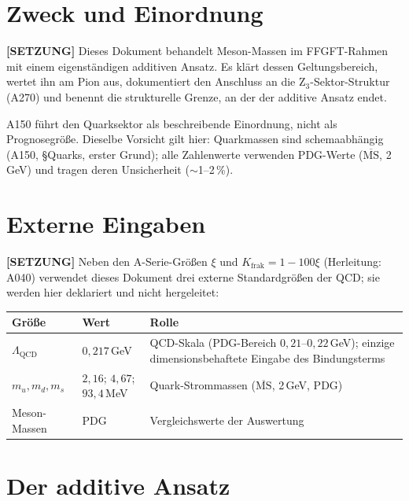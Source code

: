
\section{Zweck und Einordnung}

\textbf{[SETZUNG]} Dieses Dokument behandelt Meson-Massen im
FFGFT-Rahmen mit einem eigenständigen additiven Ansatz. Es klärt dessen
Geltungsbereich, wertet ihn am Pion aus, dokumentiert den Anschluss an
die Z$_3$-Sektor-Struktur (A270) und benennt die strukturelle Grenze,
an der der additive Ansatz endet.

A150 führt den Quarksektor als beschreibende Einordnung, nicht als
Prognosegröße. Dieselbe Vorsicht gilt hier: Quarkmassen sind
schemaabhängig (A150, \S{}Quarks, erster Grund); alle Zahlenwerte
verwenden PDG-Werte ($\overline{\text{MS}}$, 2\,GeV) und tragen deren
Unsicherheit ($\sim$1--2\,\%).

\section{Externe Eingaben}

\textbf{[SETZUNG]} Neben den A-Serie-Größen $\xi$ und
$K_\text{frak} = 1-100\xi$ (Herleitung: A040) verwendet dieses Dokument
drei externe Standardgrößen der QCD; sie werden hier deklariert und
nicht hergeleitet:

\begin{center}
\renewcommand{\arraystretch}{1.3}
{\small\begin{tabular}{llp{6cm}}
\toprule
Größe & Wert & Rolle \\
\midrule
$\Lambda_\text{QCD}$ & $0{,}217$\,GeV & QCD-Skala (PDG-Bereich
$0{,}21$--$0{,}22$\,GeV); einzige dimensionsbehaftete Eingabe des
Bindungsterms \\
$m_u, m_d, m_s$ & $2{,}16$; $4{,}67$; $93{,}4$\,MeV &
Quark-Strommassen ($\overline{\text{MS}}$, 2\,GeV, PDG) \\
Meson-Massen & PDG & Vergleichswerte der Auswertung \\
\bottomrule
\end{tabular}}
\renewcommand{\arraystretch}{1.0}
\end{center}

\section{Der additive Ansatz}

